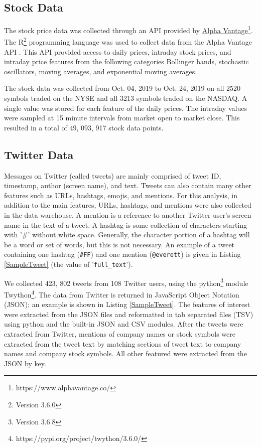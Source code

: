 \documentclass[journal]{IEEEtran}
\begin{document}
\subsection{Stock Data}

The stock price data was collected through an API provided by
 \href{https://www.alphavantage.co/}{Alpha Vantage}\footnote{https://www.alphavantage.co/}.
The R\footnote{Version 3.6.0}
 programming language was used to collect data from the Alpha Vantage API
\cite{R}.
This API provided access to daily prices, intraday stock prices,
 and intraday price features from the following categories Bollinger bands, 
 stochastic oscillators, moving averages, and exponential moving averages. 

The stock data was collected from Oct. 04, 2019 to Oct. 24, 2019 on
 all 2520 symbols traded on the NYSE and all 3213 symbols traded on the NASDAQ.
A single value was stored for each feature of the daily prices.
The intraday values were sampled at 15 minute intervals from market open
 to market close.
This resulted in a total of 49, 093, 917 stock data points.


\subsection{Twitter Data}

Messages on Twitter (called tweets) are mainly comprised of
 tweet ID, timestamp, author (screen name), and text.
Tweets can also contain many other features such as
 URLs, hashtags, emojis,  and mentions.
For this analysis, in addition to the main features,
 URLs, hashtags, and mentions were also collected in the data warehouse.
A mention is a reference to another Twitter user's screen name
 in the text of a tweet.
A hashtag is some collection of characters starting with
 '\#' without white space.
Generally, the character portion of a hashtag will be a word or set of words,
 but this is not necessary.
An example of a tweet containing one hashtag (\texttt{\#FF}) and one 
mention (\texttt{@everett}) is given in Listing \ref{SampleTweet} (the value of
 '\texttt{full\_text}').

We collected 423, 802 tweets from 108 Twitter users, using the
 python\footnote{Version 3.6.8}
 module Twython\footnote{https://pypi.org/project/twython/3.6.0/}.
The data from Twitter is returned in JavaScript Object Notation (JSON); 
 an example is shown in Listing \ref{SampleTweet}.
The features of interest were extracted from the JSON files and reformatted in tab
 separated files (TSV) using python and the built-in JSON and CSV modules.
After the tweets were extracted from Twitter,
 mentions of company names or stock symbols were extracted from the tweet text by
 matching sections of tweet text to company names and company stock symbols.
All other featured were extracted from the JSON by key.
\end{document}
